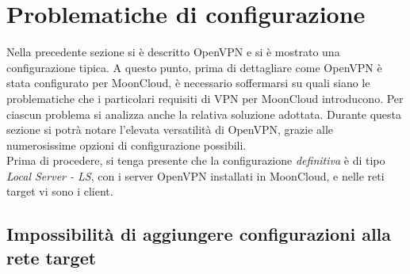 \section{Problematiche di configurazione}
Nella precedente sezione si è descritto OpenVPN e si è mostrato una configurazione
tipica. A questo punto, prima di dettagliare come OpenVPN è stata configurato
per MoonCloud, è necessario soffermarsi su quali siano le problematiche che i particolari
requisiti di VPN per MoonCloud introducono. Per
ciascun problema si analizza anche la relativa soluzione adottata. Durante
questa sezione si potrà notare l'elevata versatilità di OpenVPN, grazie alle numerosissime
opzioni di configurazione possibili.\\
Prima di procedere, si tenga presente che la configurazione \textit{definitiva}
è di tipo \textit{Local Server - LS}, con i server OpenVPN installati
in MoonCloud, e nelle reti target vi sono i client.

\subsection{Impossibilità di aggiungere configurazioni alla rete target}\label{subsec:client-nat}
